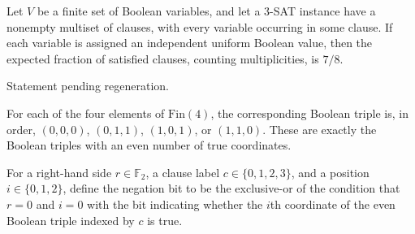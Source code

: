 \begin{theorem}
\label{FABL.uniformRandomizedAssignment_expectedValue_maxE3Sat}
\leanok
{}
Let $V$ be a finite set of Boolean variables, and let a 3-SAT instance have a nonempty
multiset of clauses, with every variable occurring in some clause. If each variable is
assigned an independent uniform Boolean value, then the expected fraction of satisfied
clauses, counting multiplicities, is $7/8$.
\end{theorem}

\begin{theorem}
\label{FABL.uniformRandomizedAssignment_expectedValue_maxE3Lin}
\leanok
{}
Statement pending regeneration.
\end{theorem}

\begin{definition}
\label{FABL.evenBooleanTriple}
\leanok
For each of the four elements of $\mathrm{Fin}(4)$, the corresponding Boolean triple is,
in order, $(0,0,0)$, $(0,1,1)$, $(1,0,1)$, or $(1,1,0)$. These are exactly the Boolean
triples with an even number of true coordinates.
\end{definition}

\begin{definition}
\label{FABL.e3LinClauseNegation}
\leanok
{}
For a right-hand side $r\in\mathbb F_2$, a clause label $c\in\{0,1,2,3\}$, and a
position $i\in\{0,1,2\}$, define the negation bit to be the exclusive-or of the
condition that $r=0$ and $i=0$ with the bit indicating whether the $i$th coordinate of
the even Boolean triple indexed by $c$ is true.
\end{definition}

